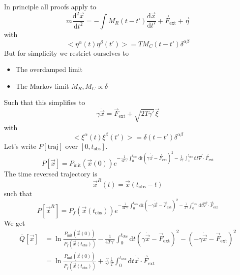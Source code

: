\documentclass[a4paper]{book}
\theoremstyle{definition}
\theoremstyle{remark}
\begin{document}
In principle all proofs apply to 
\begin{equation}
    m\frac{\text{d}^2\vec{x}}{\text{d}t^2} = -\int M_R(t-t') \frac{\text{d}\vec{x}}{\text{d}t'} + \vec{F}_{\text{ext}} + \vec{\eta}
\end{equation}
with
\begin{equation}
    <\eta^\alpha (t) \eta^\beta(t')> = TM_C(t - t') \delta^{\alpha\beta}
\end{equation}
But for simplicity we restrict ourselves to 
\begin{itemize}
    \item The overdamped limit 
    \item The Markov limit $M_R, M_C \propto \delta$
\end{itemize}
Such that this simplifies to 
\begin{equation}
    \gamma \dot{\vec{x}} = \vec{F}_{\text{ext}} + \sqrt{2T\gamma'}\vec{\xi}
\end{equation}
with 
\begin{equation}
    <\xi^\alpha (t) \xi^\beta(t')> = \delta(t - t') \delta^{\alpha\beta}
\end{equation}
Let's write $P[\text{traj}]$ over $[0, t_{\text{obs}}]$. 
\begin{equation}
    P[\vec{x}] = P_{\text{init}}(\vec{x}(0)) e^{-\frac{1}{4T\gamma'}\int_0^{t_{\text{obs}}}\text{d}t (\gamma \dot{\vec{x}} - \vec{F}_{\text{ext}})^2 - \frac{1}{2\gamma}\int_{0}^{t_{\text{obs}}}\text{d}t \vec{\nabla}\cdot \vec{F}_{\text{ext}}}
\end{equation}
The time reversed trajectory is 
\begin{equation}
    \vec{x}^R (t) = \vec{x}(t_{\text{obs}} - t)
\end{equation}
such that 
\begin{equation}
    P[\vec{x}^R] = P_{f}(\vec{x}(t_\text{obs})) e^{-\frac{1}{4T\gamma'}\int_0^{t_{\text{obs}}}\text{d}t (-\gamma \dot{\vec{x}} - \vec{F}_{\text{ext}})^2 - \frac{1}{2\gamma}\int_{0}^{t_{\text{obs}}}\text{d}t \vec{\nabla}\cdot \vec{F}_{\text{ext}}}
\end{equation}
We get 
\begin{equation}
    \begin{aligned}
        \bar{Q}[\vec{x}] &= \ln\frac{P_{\text{init}}(\vec{x}(0))}{P_{f}(\vec{x}(t_\text{obs}))} -\frac{1}{4T\gamma'}\int_0^{t_{\text{obs}}}\text{d}t (\gamma \dot{\vec{x}} - \vec{F}_{\text{ext}})^2  - (-\gamma \dot{\vec{x}} - \vec{F}_{\text{ext}})^2 \\
        &= \ln\frac{P_{\text{init}}(\vec{x}(0))}{P_{f}(\vec{x}(t_\text{obs}))} + \frac{\gamma}{\gamma '}\frac{1}{T}\int_0^{t_{\text{obs}}} \text{d}t \dot{\vec{x}} \cdot \vec{F}_{\text{ext}}
    \end{aligned}
\end{equation}
\end{document}
